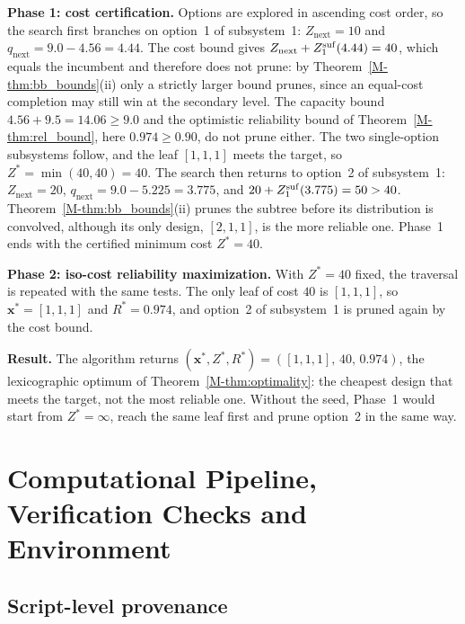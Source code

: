 \documentclass[11pt]{article}
\begin{document}
\textbf{Phase 1: cost certification.} Options are explored in ascending cost order, so the search first branches on option~1 of subsystem~1: $Z_{\mathrm{next}}=10$ and $q_{\mathrm{next}}=9.0-4.56=4.44$. The cost bound gives $Z_{\mathrm{next}}+Z^{\mathrm{suf}}_1(4.44)=40$, which equals the incumbent and therefore does not prune: by Theorem~\ref*{M-thm:bb_bounds}(ii) only a strictly larger bound prunes, since an equal-cost completion may still win at the secondary level. The capacity bound $4.56+9.5=14.06\ge 9.0$ and the optimistic reliability bound of Theorem~\ref*{M-thm:rel_bound}, here $0.974\ge 0.90$, do not prune either. The two single-option subsystems follow, and the leaf $[1,1,1]$ meets the target, so $Z^*=\min(40,40)=40$. The search then returns to option~2 of subsystem~1: $Z_{\mathrm{next}}=20$, $q_{\mathrm{next}}=9.0-5.225=3.775$, and $20+Z^{\mathrm{suf}}_1(3.775)=50>40$. Theorem~\ref*{M-thm:bb_bounds}(ii) prunes the subtree before its distribution is convolved, although its only design, $[2,1,1]$, is the more reliable one. Phase~1 ends with the certified minimum cost $Z^*=40$.

\textbf{Phase 2: iso-cost reliability maximization.} With $Z^*=40$ fixed, the traversal is repeated with the same tests. The only leaf of cost $40$ is $[1,1,1]$, so $\mathbf{x}^*=[1,1,1]$ and $R^*=0.974$, and option~2 of subsystem~1 is pruned again by the cost bound.

\textbf{Result.} The algorithm returns $(\mathbf{x}^*,Z^*,R^*)=([1,1,1],\,40,\,0.974)$, the lexicographic optimum of Theorem~\ref*{M-thm:optimality}: the cheapest design that meets the target, not the most reliable one. Without the seed, Phase~1 would start from $Z^*=\infty$, reach the same leaf first and prune option~2 in the same way.

\section{Computational Pipeline, Verification Checks and Environment} \label{sec:supp_pipeline}

\subsection{Script-level provenance}
\end{document}
